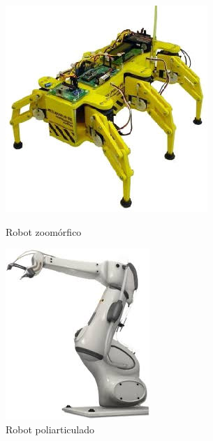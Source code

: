 \begin{figure}[H]
	\begin{minipage}{0.48\textwidth}
    	\centering
     	\includegraphics[scale=0.6]{img/robot-zoomorfico.jpg}
  		\caption{Robot zoomórfico}
  		\label{fig:unimate}
   	\end{minipage}\hfill
   	\begin {minipage}{0.48\textwidth}
     	\centering
     	\includegraphics[scale=0.6]{img/robot-poliarticulado.jpg}
     	\caption{Robot poliarticulado}
     	\label{fig:shakey}
	\end{minipage}
\end{figure}


